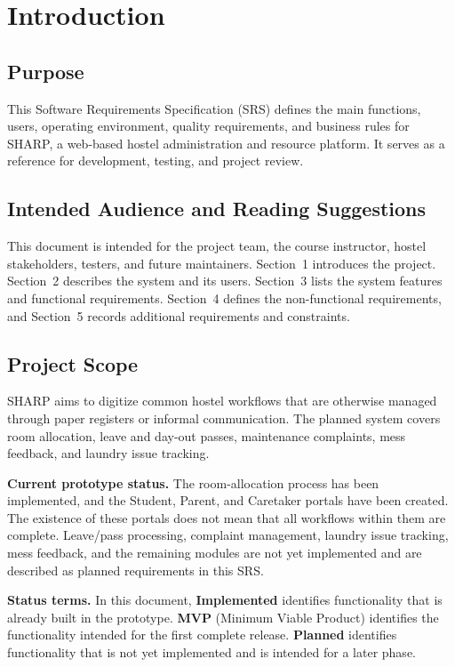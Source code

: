 \documentclass[11pt,a4paper]{article}
\numberwithin{figure}{section}   %
\begin{document}
\section{Introduction}
\subsection{Purpose}
This Software Requirements Specification (SRS) defines the main functions, users, operating environment, quality requirements, and business rules for SHARP, a web-based hostel administration and resource platform. It serves as a reference for development, testing, and project review.

\subsection{Intended Audience and Reading Suggestions}
This document is intended for the project team, the course instructor, hostel stakeholders, testers, and future maintainers. Section~1 introduces the project. Section~2 describes the system and its users. Section~3 lists the system features and functional requirements. Section~4 defines the non-functional requirements, and Section~5 records additional requirements and constraints.

\subsection{Project Scope}
SHARP aims to digitize common hostel workflows that are otherwise managed through paper registers or informal communication. The planned system covers room allocation, leave and day-out passes, maintenance complaints, mess feedback, and laundry issue tracking.

\textbf{Current prototype status.} The room-allocation process has been implemented, and the Student, Parent, and Caretaker portals have been created. The existence of these portals does not mean that all workflows within them are complete. Leave/pass processing, complaint management, laundry issue tracking, mess feedback, and the remaining modules are not yet implemented and are described as planned requirements in this SRS.

\textbf{Status terms.} In this document, \textbf{Implemented} identifies functionality that is already built in the prototype. \textbf{MVP} (Minimum Viable Product) identifies the functionality intended for the first complete release. \textbf{Planned} identifies functionality that is not yet implemented and is intended for a later phase.
\end{document}
